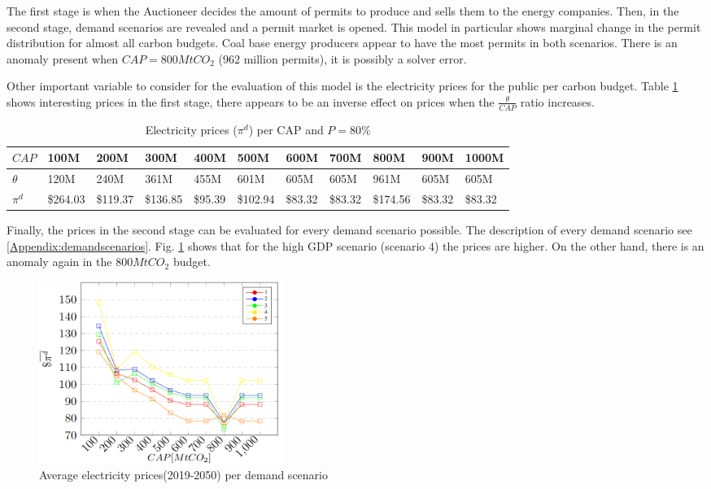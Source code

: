 \documentclass[a4paper,fleqn]{cas-dc}
\begin{document}
The first stage is when the Auctioneer decides the amount of permits to produce and sells them to the energy companies. Then, in the second stage, demand scenarios are revealed and a permit market is opened. This model in particular shows marginal change in the permit distribution for almost all carbon budgets. Coal base energy producers appear to have the most permits in both scenarios. There is an anomaly present when $CAP=800MtCO_2$ (962 million permits), it is possibly a solver error.

Other important variable to consider for the evaluation of this model is the electricity prices for the public per carbon budget. Table \ref{POpidporcap} shows interesting prices in the first stage, there appears to be an inverse effect on prices when the $\frac{\theta}{CAP}$ ratio increases.

\begin{table}[t]
\caption{{\footnotesize Electricity prices ($\pi^d$) per CAP and $P=80\%$}}\label{POpidporcap}
\begin{footnotesize}
    \centering
    \begin{tabular}{ l l l l l l l l l l l }
    \hline
        $CAP$ & 100M & 200M & 300M & 400M & 500M & 600M & 700M & 800M & 900M & 1000M \\ \hline
        $\theta$  & 120M & 240M & 361M & 455M & 601M & 605M & 605M & 961M & 605M & 605M \\ \hline
        $\pi^d$  &  \$264.03   &  \$119.37   &  \$136.85   &  \$95.39   &  \$102.94   &  \$83.32   &  \$83.32   &  \$174.56   &  \$83.32   &  \$83.32   \\ \hline
    \end{tabular}
\end{footnotesize}
\end{table}

Finally, the prices in the second stage can be evaluated for every demand scenario possible. The description of every demand scenario see \ref{Appendix:demandscenarios}. Fig. \ref{pidcap} shows that for the high GDP scenario (scenario 4) the prices are higher. On the other hand, there is an anomaly again in the $800MtCO_2$ budget.

\begin{figure}[h]
\centering
\includegraphics[width=8cm]{Submissions/EnergyPolicy/Images/Electricity prices per scenario PO.png}
\caption{{\footnotesize Average electricity prices(2019-2050) per demand scenario}}
\label{pidcap}
\end{figure}
\end{document}
